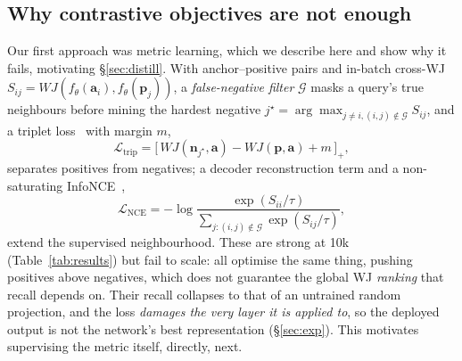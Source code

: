 \documentclass[sigconf]{acmart}
\begin{document}
\subsection{Why contrastive objectives are not enough}
\label{sec:contrastive}
Our first approach was metric learning, which we describe here and show why it
fails, motivating \S\ref{sec:distill}. With anchor--positive pairs and in-batch
cross-WJ $S_{ij}=WJ(f_\theta(\mathbf{a}_i),f_\theta(\mathbf{p}_j))$, a
\emph{false-negative filter} $\mathcal{G}$ masks a query's true neighbours before
mining the hardest negative
$j^\star=\arg\max_{j\neq i,(i,j)\notin\mathcal{G}}S_{ij}$, and a triplet
loss~\cite{schroff15} with margin $m$,
\begin{equation}
  \mathcal{L}_{\mathrm{trip}}=\big[\,WJ(\mathbf{n}_{j^\star},\mathbf{a})
     -WJ(\mathbf{p},\mathbf{a})+m\,\big]_{+},
  \label{eq:triplet}
\end{equation}
separates positives from negatives; a decoder reconstruction term and a
non-saturating InfoNCE~\cite{oord18},
\begin{equation}
  \mathcal{L}_{\mathrm{NCE}}=-\log\frac{\exp(S_{ii}/\tau)}
       {\sum_{j:(i,j)\notin\mathcal{G}}\exp(S_{ij}/\tau)},
  \label{eq:infonce}
\end{equation}
extend the supervised neighbourhood. These are strong at 10k
(Table~\ref{tab:results}) but fail to scale: all optimise the same thing,
pushing positives above negatives, which does not guarantee the global WJ
\emph{ranking} that recall depends on. Their recall collapses to that of an
untrained random projection, and the loss \emph{damages the very layer it is
applied to}, so the deployed output is not the network's best representation
(\S\ref{sec:exp}). This motivates supervising the metric itself, directly, next.
\end{document}

